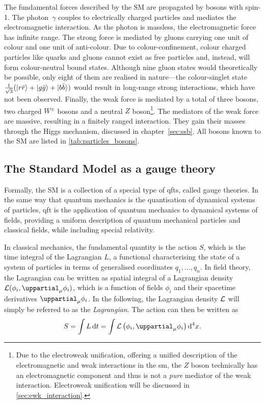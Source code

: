 The fundamental forces described by the SM are propagated by bosons with spin-1.
The photon~$\gamma$ couples to electrically charged particles and mediates the electromagnetic interaction.
As the photon is massless, the electromagnetic force has infinite range.
The strong force is mediated by gluons carrying one unit of colour and one unit of anti-colour.
Due to colour-confinement, colour charged particles like quarks and gluons cannot exist as free particles and, instead, will form colour-neutral bound states.
Although nine gluon states would theoretically be possible, only eight of them are realised in nature---the colour-singlet state $\frac{1}{\sqrt{3}}(\ket{r\bar{r}}+\ket{g\bar{g}}+\ket{b\bar{b}})$ would result in long-range strong interactions, which have not been observed.
Finally, the weak force is mediated by a total of three bosons, two charged $W^\pm$ bosons and a neutral $Z$ boson\footnote{Due to the electroweak unification, offering a unified description of the electromagnetic and weak interactions in the \gls{sm}, the $Z$ boson technically has an electromagnetic component and thus is not a \textit{pure} mediator of the weak interaction. Electroweak unification will be discussed in \cref{sec:ewk_interaction}.}.
The mediators of the weak force are massive, resulting in a finitely ranged interaction. They gain their masses through the Higgs mechanism, discussed in chapter~\cref{sec:ssb}. All bosons known to the SM are listed in \cref{tab:particles_bosons}.

\subsection{The Standard Model as a gauge theory}\label{ch:gauge_theory}

Formally, the SM is a collection of a special type of \glspl{qft}, called gauge theories. In the same way that quantum mechanics is the quantisation of dynamical systems of particles, \gls{qft} is the application of quantum mechanics to dynamical systems of fields, providing a uniform description of quantum mechanical particles and classical fields, while including special relativity.

In classical mechanics, the fundamental quantity  is the action $S$, which is the time integral of the Lagrangian $L$, a functional characterising the state of a system of particles in terms of generalised coordinates $q_1, \dots, q_n$. In field theory, the Lagrangian can be written as spatial integral of a Lagrangian density $\Lagr(\phi_i,\uppartial_\mu\phi_i)$, which is a function of fields $\phi_i$ and their spacetime derivatives $\uppartial_\mu\phi_i$. In the following, the Lagrangian density $\mathcal{L}$ will simply be referred to as the \textit{Lagrangian}. The action can then be written as
\begin{equation}
	S = \int L\diff t = \int\Lagr\left(\phi_i,\uppartial_\mu\phi_i\right)\Diff4 x.
\end{equation}

